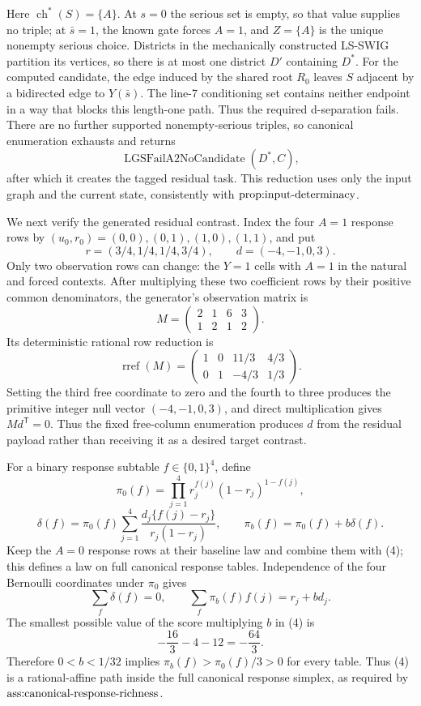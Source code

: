 Here \(\operatorname{ch}^*(S)=\{A\}\).  At \(s=0\) the serious set is empty, so that value supplies no triple; at \(\bar s=1\), the known gate forces \(A=1\), and \(Z=\{A\}\) is the unique nonempty serious choice.  Districts in the mechanically constructed LS-SWIG partition its vertices, so there is at most one district \(D'\) containing \(D^*\).  For the computed candidate, the edge induced by the shared root \(R_0\) leaves \(S\) adjacent by a bidirected edge to \(Y(\bar s)\).  The line-7 conditioning set contains neither endpoint in a way that blocks this length-one path.  Thus the required d-separation fails.  There are no further supported nonempty-serious triples, so canonical enumeration exhausts and returns
\[
 \operatorname{LGSFailA2NoCandidate}(D^*,C),
\tag{2}
\]
after which it creates the tagged residual task.  This reduction uses only the input graph and the current state, consistently with \(\textnormal{prop:input-determinacy}\).

We next verify the generated residual contrast.  Index the four \(A=1\) response rows by \((u_0,r_0)=(0,0),(0,1),(1,0),(1,1)\), and put
\[
 r=(3/4,1/4,1/4,3/4),
 \qquad d=(-4,-1,0,3).
\tag{3}
\]
Only two observation rows can change: the \(Y=1\) cells with \(A=1\) in the natural and forced contexts.  After multiplying these two coefficient rows by their positive common denominators, the generator's observation matrix is
\[
 M=\begin{pmatrix}2&1&6&3\\1&2&1&2\end{pmatrix}.
\]
Its deterministic rational row reduction is
\[
 \operatorname{rref}(M)=
 \begin{pmatrix}1&0&11/3&4/3\\0&1&-4/3&1/3\end{pmatrix}.
\]
Setting the third free coordinate to zero and the fourth to three produces the primitive integer null vector \((-4,-1,0,3)\), and direct multiplication gives \(Md^{\mathsf T}=0\).  Thus the fixed free-column enumeration produces \(d\) from the residual payload rather than receiving it as a desired target contrast.

For a binary response subtable \(f\in\{0,1\}^4\), define
\[
 \pi_0(f)=\prod_{j=1}^4r_j^{f(j)}(1-r_j)^{1-f(j)},
\]
\[
 \delta(f)=\pi_0(f)\sum_{j=1}^4
 \frac{d_j\{f(j)-r_j\}}{r_j(1-r_j)},
 \qquad
 \pi_b(f)=\pi_0(f)+b\delta(f).
\tag{4}
\]
Keep the \(A=0\) response rows at their baseline law and combine them with (4); this defines a law on full canonical response tables.  Independence of the four Bernoulli coordinates under \(\pi_0\) gives
\[
 \sum_f\delta(f)=0,
 \qquad
 \sum_f\pi_b(f)f(j)=r_j+bd_j.
\tag{5}
\]
The smallest possible value of the score multiplying \(b\) in (4) is
\[
 -\frac{16}{3}-4-12=-\frac{64}{3}.
\]
Therefore \(0<b<1/32\) implies \(\pi_b(f)>\pi_0(f)/3>0\) for every table.  Thus (4) is a rational-affine path inside the full canonical response simplex, as required by \(\textnormal{ass:canonical-response-richness}\).

